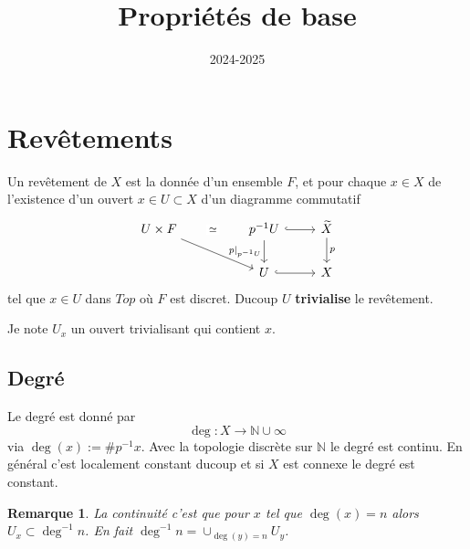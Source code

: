 \documentclass[a4paper,12pt]{article}
\title{Propriétés de base}
\date{2024-2025}
\newcommand{\N}{\mathbb{N}}
\theoremstyle{plain}
\newtheorem{rem}{Remarque}
\theoremstyle{definition}
\theoremstyle{remark}
\begin{document}
\maketitle
\tableofcontents

\section{Revêtements}
Un revêtement de $X$ est la donnée d'un ensemble $F$, 
et pour chaque $x\in X$ de l'existence d'un ouvert 
$x\in U\subset X$ d'un diagramme commutatif 
\[\begin{tikzcd}
	{U\times F} && {p^{-1}U} & {\widetilde X} \\
	&& U & X
	\arrow["\simeq"{description}, draw=none, from=1-1, to=1-3]
	\arrow[from=1-1, to=2-3]
	\arrow[hook, from=1-3, to=1-4]
	\arrow["{p|_{p^{-1}U}}"', from=1-3, to=2-3]
	\arrow["p", from=1-4, to=2-4]
	\arrow[hook, from=2-3, to=2-4]
\end{tikzcd}\]
tel que $x\in U$ dans $Top$ où $F$ est discret. Ducoup
$U$ \textbf{trivialise} le revêtement.

Je note $U_x$ un ouvert trivialisant qui contient $x$.

\subsection{Degré}
Le degré est donné par 
\[\deg\colon X\to \N\cup\infty\]
via $\deg(x):=\#p^{-1}x$. Avec la topologie discrète sur
$\N$ le degré est continu. En général c'est localement
constant ducoup et si $X$ est connexe le degré
est constant.

\begin{rem}
  La continuité c'est que pour $x$ tel que $\deg(x)=n$
  alors $U_x\subset \deg^{-1}n$. En fait 
  $\deg^{-1}n=\cup_{\deg(y)=n}U_y$.
\end{rem}
\end{document}
